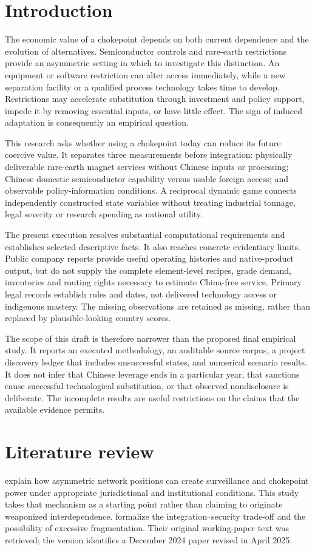 \documentclass[11pt]{article}
\begin{document}
\section{Introduction}
The economic value of a chokepoint depends on both current dependence and the evolution of alternatives. Semiconductor controls and rare-earth restrictions provide an asymmetric setting in which to investigate this distinction. An equipment or software restriction can alter access immediately, while a new separation facility or a qualified process technology takes time to develop. Restrictions may accelerate substitution through investment and policy support, impede it by removing essential inputs, or have little effect. The sign of induced adaptation is consequently an empirical question.

This research asks whether using a chokepoint today can reduce its future coercive value. It separates three measurements before integration: physically deliverable rare-earth magnet services without Chinese inputs or processing; Chinese domestic semiconductor capability versus usable foreign access; and observable policy-information conditions. A reciprocal dynamic game connects independently constructed state variables without treating industrial tonnage, legal severity or research spending as national utility.

The present execution resolves substantial computational requirements and establishes selected descriptive facts. It also reaches concrete evidentiary limits. Public company reports provide useful operating histories and native-product output, but do not supply the complete element-level recipes, grade demand, inventories and routing rights necessary to estimate China-free service. Primary legal records establish rules and dates, not delivered technology access or indigenous mastery. The missing observations are retained as missing, rather than replaced by plausible-looking country scores.

The scope of this draft is therefore narrower than the proposed final empirical study. It reports an executed methodology, an auditable source corpus, a project discovery ledger that includes unsuccessful states, and numerical scenario results. It does not infer that Chinese leverage ends in a particular year, that sanctions cause successful technological substitution, or that observed nondisclosure is deliberate. The incomplete results are useful restrictions on the claims that the available evidence permits.

\section{Literature review}
\citet{R01} explain how asymmetric network positions can create surveillance and chokepoint power under appropriate jurisdictional and institutional conditions. This study takes that mechanism as a starting point rather than claiming to originate weaponized interdependence. \citet{R02} formalize the integration--security trade-off and the possibility of excessive fragmentation. Their original working-paper text was retrieved; the version identifies a December 2024 paper revised in April 2025.
\end{document}
